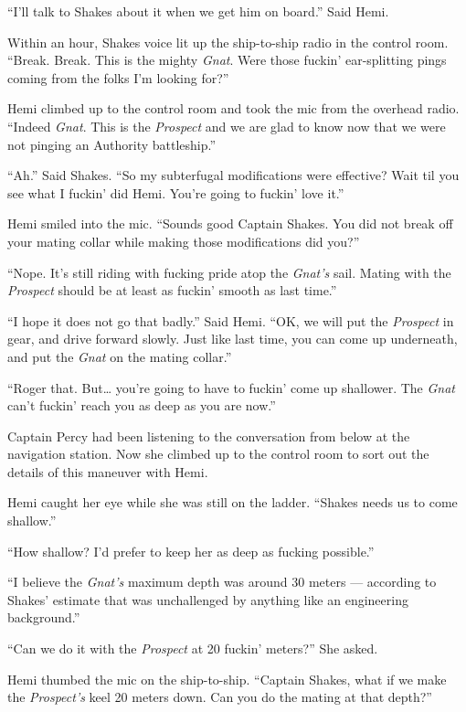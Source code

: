 \documentclass[]{scrbook}
\begin{document}
``I'll talk to Shakes about it when we get him on board.'' Said Hemi.

Within an hour, Shakes voice lit up the ship-to-ship radio in the
control room. ``Break. Break. This is the mighty \emph{Gnat}. Were those
fuckin' ear-splitting pings coming from the folks I'm looking for?''

Hemi climbed up to the control room and took the mic from the overhead
radio. ``Indeed \emph{Gnat}. This is the \emph{Prospect} and we are glad
to know now that we were not pinging an Authority battleship.''

``Ah.'' Said Shakes. ``So my subterfugal modifications were effective?
Wait til you see what I fuckin' did Hemi. You're going to fuckin' love
it.''

Hemi smiled into the mic. ``Sounds good Captain Shakes. You did not
break off your mating collar while making those modifications did you?''

``Nope. It's still riding with fucking pride atop the \emph{Gnat's}
sail. Mating with the \emph{Prospect} should be at least as fuckin'
smooth as last time.''

``I hope it does not go that badly.'' Said Hemi. ``OK, we will put the
\emph{Prospect} in gear, and drive forward slowly. Just like last time,
you can come up underneath, and put the \emph{Gnat} on the mating
collar.''

``Roger that. But\ldots{} you're going to have to fuckin' come up
shallower. The \emph{Gnat} can't fuckin' reach you as deep as you are
now.''

Captain Percy had been listening to the conversation from below at the
navigation station. Now she climbed up to the control room to sort out
the details of this maneuver with Hemi.

Hemi caught her eye while she was still on the ladder. ``Shakes needs us
to come shallow.''

``How shallow? I'd prefer to keep her as deep as fucking possible.''

``I believe the \emph{Gnat's} maximum depth was around 30 meters ---
according to Shakes' estimate that was unchallenged by anything like an
engineering background.''

``Can we do it with the \emph{Prospect} at 20 fuckin' meters?'' She
asked.

Hemi thumbed the mic on the ship-to-ship. ``Captain Shakes, what if we
make the \emph{Prospect's} keel 20 meters down. Can you do the mating at
that depth?''
\end{document}
